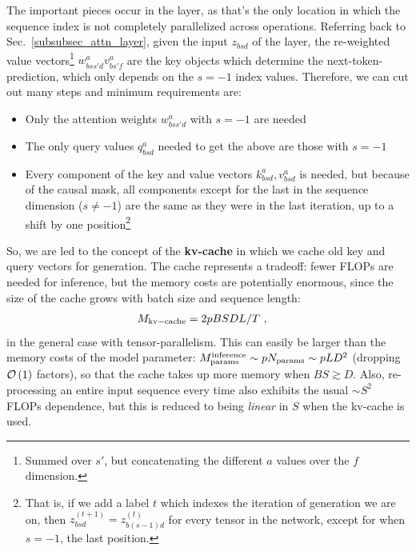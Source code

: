 \documentclass[11pt]{article}
\begin{document}
The important pieces occur in the  layer, as that's the only location in
which the sequence index is not completely parallelized across operations. Referring back to
Sec.~\ref{subsubsec_attn_layer}, given the input $ z _{ bsd } $ of the 
layer, the re-weighted value vectors\footnote{Summed over $ s' $, but concatenating the different $
a $ values over the $ f $ dimension.} $ w ^{ a }_{ bss'd } v ^{ a } _{ bs'f } $ are the key objects
which determine the next-token-prediction, which only depends on the $ s=-1 $ index values.
Therefore, we can cut out many steps and minimum requirements are:
\begin{itemize}
    \item Only the attention weights $ w ^{ a }_{ bss'd }$ with $ s=-1 $ are needed
    \item The only query values $ q ^{ a }_{ bsd } $ needed to get the above are those with $ s=-1 $
    \item Every component of the key and value vectors $k ^{ a }_{ bsd }, v ^{ a }_{ bsd } $ is
        needed, but because of the causal mask, all components except for the last in the sequence
        dimension ($ s\neq -1 $) are the same as they were in the last iteration, up to a shift
        by one position\footnote{That is, if we add a label $ t $ which indexes the iteration of generation
        we are on, then $ z ^{ (t+1) } _{ bsd } = z ^{ (t)} _{ b (s-1)d } $ for every tensor in the network, except for when $ s=-1 $, the last position.}
\end{itemize}

So, we are led to the concept of the \textbf{kv-cache} in which we cache old key and query vectors for generation.
The cache represents a tradeoff: fewer FLOPs are needed for inference, but the memory costs are potentially
enormous, since the size of the cache grows with batch size and sequence length:
\begin{align}
    M _{ {\rm kv-cache}  } &= 2pBSDL /T\ ,  \label{eq_kv_cache_memory}
\end{align}
in the general case with tensor-parallelism. This can easily be larger than the memory costs of the
model parameter: $ M _{ {\rm params}  } ^{ {\rm  inference}  } \sim p N _{ {\rm params}  } \sim p LD
^{ 2 }  $ (dropping $ \mathcal{O} \left( 1 \right)  $ factors), so that the cache takes up more memory
when $ BS \gtrsim D $. Also, re-processing an entire input sequence every time also exhibits the
usual $\sim S ^{ 2 }  $ FLOPs dependence, but this is reduced to being \textit{linear} in $ S $
when the kv-cache is used.
\end{document}
